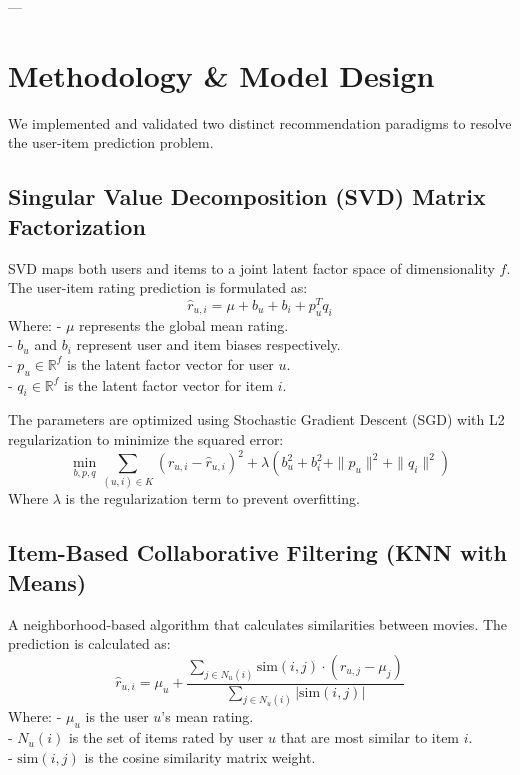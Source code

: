 \documentclass[11pt,a4paper]{article}
\begin{document}
---

\section{Methodology \& Model Design}
We implemented and validated two distinct recommendation paradigms to resolve the user-item prediction problem.

\subsection{Singular Value Decomposition (SVD) Matrix Factorization}
SVD maps both users and items to a joint latent factor space of dimensionality $f$. The user-item rating prediction is formulated as:
\begin{equation}
\hat{r}_{u,i} = \mu + b_u + b_i + p_u^T q_i
\end{equation}
Where:
- $\mu$ represents the global mean rating.\\
- $b_u$ and $b_i$ represent user and item biases respectively.\\
- $p_u \in \mathbb{R}^f$ is the latent factor vector for user $u$.\\
- $q_i \in \mathbb{R}^f$ is the latent factor vector for item $i$.

The parameters are optimized using Stochastic Gradient Descent (SGD) with L2 regularization to minimize the squared error:
\begin{equation}
\min_{b, p, q} \sum_{(u,i) \in K} (r_{u,i} - \hat{r}_{u,i})^2 + \lambda (b_u^2 + b_i^2 + \|p_u\|^2 + \|q_i\|^2)
\end{equation}
Where $\lambda$ is the regularization term to prevent overfitting.

\subsection{Item-Based Collaborative Filtering (KNN with Means)}
A neighborhood-based algorithm that calculates similarities between movies. The prediction is calculated as:
\begin{equation}
\hat{r}_{u,i} = \mu_u + \frac{\sum_{j \in N_u(i)} \text{sim}(i, j) \cdot (r_{u,j} - \mu_j)}{\sum_{j \in N_u(i)} |\text{sim}(i, j)|}
\end{equation}
Where:
- $\mu_u$ is the user $u$'s mean rating.\\
- $N_u(i)$ is the set of items rated by user $u$ that are most similar to item $i$.\\
- $\text{sim}(i, j)$ is the cosine similarity matrix weight.
\end{document}
